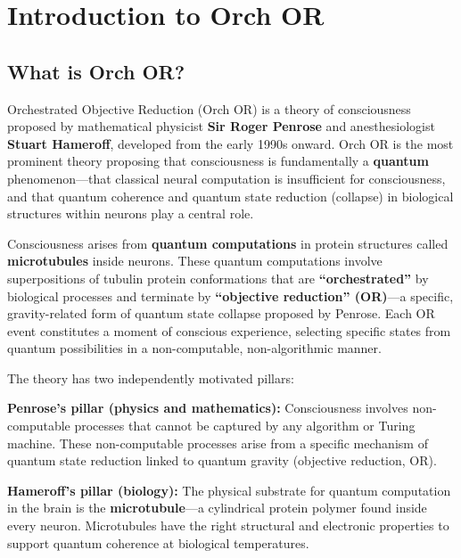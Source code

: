 \documentclass[11pt,a4paper]{report}
\begin{document}
\chapter{Introduction to Orch OR}

\section{What is Orch OR?}

Orchestrated Objective Reduction (Orch OR) is a theory of consciousness proposed by mathematical physicist \textbf{Sir Roger Penrose} and anesthesiologist \textbf{Stuart Hameroff}, developed from the early 1990s onward. Orch OR is the most prominent theory proposing that consciousness is fundamentally a \textbf{quantum} phenomenon---that classical neural computation is insufficient for consciousness, and that quantum coherence and quantum state reduction (collapse) in biological structures within neurons play a central role.

\begin{definitionbox}
Consciousness arises from \textbf{quantum computations} in protein structures called \textbf{microtubules} inside neurons. These quantum computations involve superpositions of tubulin protein conformations that are \textbf{``orchestrated''} by biological processes and terminate by \textbf{``objective reduction'' (OR)}---a specific, gravity-related form of quantum state collapse proposed by Penrose. Each OR event constitutes a moment of conscious experience, selecting specific states from quantum possibilities in a non-computable, non-algorithmic manner.
\end{definitionbox}

The theory has two independently motivated pillars:

\textbf{Penrose's pillar (physics and mathematics):} Consciousness involves non-computable processes that cannot be captured by any algorithm or Turing machine. These non-computable processes arise from a specific mechanism of quantum state reduction linked to quantum gravity (objective reduction, OR).

\textbf{Hameroff's pillar (biology):} The physical substrate for quantum computation in the brain is the \textbf{microtubule}---a cylindrical protein polymer found inside every neuron. Microtubules have the right structural and electronic properties to support quantum coherence at biological temperatures.
\end{document}

